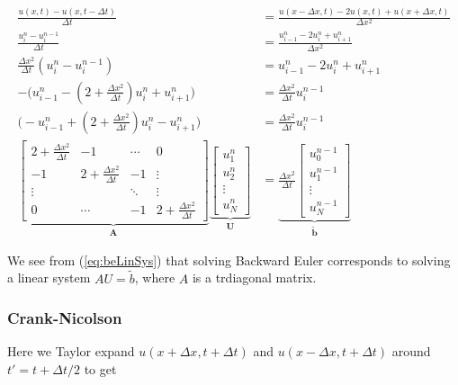 \documentclass{article}
\begin{document}
\begin{subequations}
	\begin{align}
		\frac{u(x, t) - u(x,t - \Delta t)}{\Delta t}  &= \frac{u(x - \Delta x, t) - 2u(x,t) + u(x+ \Delta x, t)}{\Delta x^2} \\
		\frac{u_i^n - u_i^{n-1}}{\Delta t}  &= \frac{u_{i-1}^n - 2u_i^n + u_{i+1}^n}{\Delta x^2} \\
		\frac{\Delta x^2}{\Delta t}(u_i^n - u_i^{n-1})  &=  u_{i-1}^n - 2u_i^n + u_{i+1}^n\\
		- \Big(u_{i-1}^n - (2 + \frac{\Delta x^2}{\Delta t}) u_i^n + u_{i+1}^n\Big)   &=  \frac{\Delta x^2}{\Delta t}u_i^{n-1}\\
		 \Big(-u_{i-1}^n + (2 + \frac{\Delta x^2}{\Delta t}) u_i^n - u_{i+1}^n\Big)   &=  \frac{\Delta x^2}{\Delta t}u_i^{n-1}\\
		\underbrace{\begin{bmatrix} 2 + \frac{\Delta x^2}{\Delta t} & -1 & \cdots & 0 \\ -1 & 2 + \frac{\Delta x^2}{\Delta t} & -1 & \vdots \\
			\vdots & &  \ddots & \vdots \\ 
			0 & \cdots & -1 & 2 + \frac{\Delta x^2}{\Delta t} \end{bmatrix}}_{\mathbf{A}} 
		\underbrace{\begin{bmatrix} u_1^n\\ u_2^n \\ \vdots\\ u_N^n \end{bmatrix}}_{\mathbf{U}} &= 
		\underbrace{\frac{\Delta x^2}{\Delta t} \begin{bmatrix} u_0^{n-1}\\ u_1^{n-1} \\ \vdots \\ u_N^{n-1}\end{bmatrix}}_{\mathbf{\tilde{b}}}\label{eq:beLinSys}
	\end{align}
\end{subequations}

We see from (\ref{eq:beLinSys}) that solving Backward Euler corresponds to solving a linear system $A U = \tilde{b}$, where $A$ is a trdiagonal matrix. 
	
\subsubsection{Crank-Nicolson}
Here we Taylor expand $u(x+\Delta x, t+\Delta t)$ and $u(x-\Delta x, t+\Delta t)$ around $t'=t+\Delta t/2$ to get
\end{document}
